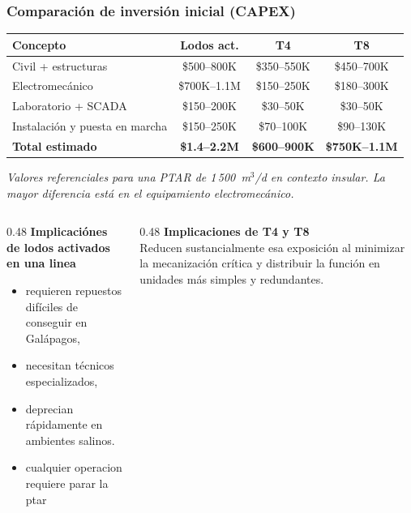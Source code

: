 \documentclass[aspectratio=169]{beamer}
\begin{document}
\begin{frame}
\frametitle{Comparaci\'{o}n de inversi\'{o}n inicial (CAPEX)}
\centering
\footnotesize
\renewcommand{\arraystretch}{1.1}
\begin{tabular}{lccc}
\toprule
\textbf{Concepto} & \textbf{Lodos act.} & \textbf{T4} & \textbf{T8} \\
\midrule
Civil + estructuras & \$500--800K & \$350--550K & \$450--700K \\
Electromec\'{a}nico & \$700K--1.1M & \$150--250K & \$180--300K \\
Laboratorio + SCADA & \$150--200K & \$30--50K & \$30--50K \\
Instalaci\'{o}n y puesta en marcha & \$150--250K & \$70--100K & \$90--130K \\
\midrule
\textbf{Total estimado} & \textbf{\$1.4--2.2M} & \textbf{\$600--900K} & \textbf{\$750K--1.1M} \\
\bottomrule
\end{tabular}

\vspace{4pt}
\scriptsize
\textit{Valores referenciales para una PTAR de 1\,500~m$^3$/d en contexto insular. La mayor diferencia est\'{a} en el equipamiento electromec\'{a}nico.}

\vspace{8pt}
\begin{columns}[T]
\begin{column}{0.48\textwidth}
\footnotesize
\textbf{Implicaci\'{o}nes de lodos activados en una linea}\\[2pt]
\scriptsize
\begin{itemize}
\scriptsize
\item requieren repuestos dif\'{i}ciles de conseguir en Gal\'{a}pagos,
\item necesitan t\'{e}cnicos especializados,
\item deprecian r\'{a}pidamente en ambientes salinos.
\item cualquier operacion requiere parar la ptar
\end{itemize}
\end{column}
\begin{column}{0.48\textwidth}
\footnotesize
\textbf{Implicaciones de T4 y T8}\\[2pt]
\scriptsize
Reducen sustancialmente esa exposici\'{o}n al minimizar la mecanizaci\'{o}n cr\'{i}tica y distribuir la funci\'{o}n en unidades m\'{a}s simples y redundantes.
\end{column}
\end{columns}
\end{frame}
\end{document}
